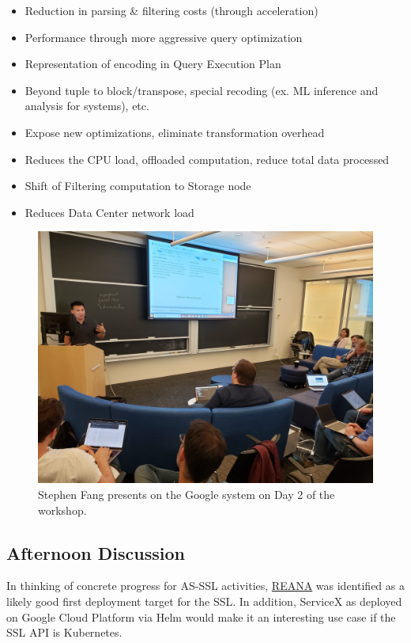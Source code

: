 \documentclass[11pt,letterpaper,fleqn]{article}
\begin{document}
\begin{itemize}
  \item Reduction in parsing \& filtering costs (through acceleration)
  \item Performance through more aggressive query optimization
  \item Representation of encoding in Query Execution Plan
  \item Beyond tuple to block/transpose, special recoding (ex. ML inference and analysis for systems), etc.
  \item Expose new optimizations, eliminate transformation overhead
  \item Reduces the CPU load, offloaded computation, reduce total data processed
  \item Shift of Filtering computation to Storage node
  \item Reduces Data Center network load
\end{itemize}


\begin{figure}
\centering
  \includegraphics[width=0.89\linewidth]{figures/google.jpg}
  \caption{Stephen Fang presents on the Google system on Day 2 of the workshop.}
  \label{fig:google}
\end{figure}

\subsection{Afternoon Discussion}
\vspace{0.2cm}
In thinking of concrete progress for AS-SSL activities, \href{http://www.reanahub.io/}{REANA} was identified as a likely good first deployment target for the SSL. In addition, ServiceX as deployed on Google Cloud Platform via Helm would make it an interesting use case if the SSL API is Kubernetes.
\end{document}
